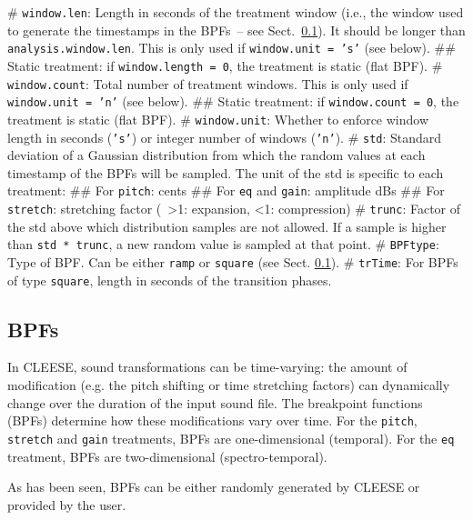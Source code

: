 \documentclass[oneside,10pt]{article}
\newcommand{\mip}{\texttt}
\newcommand{\mic}{\texttt}
\begin{document}
\vspace{10pt}
\begin{easylist}[itemize]
# \texttt{window.len}: Length in seconds of the treatment window (i.e., the
        window used to generate the timestamps in the BPFs~-- see
        Sect.~\ref{sec:bpf}). It should be longer than
        \texttt{analysis.window.len}. This is only used if \mic{window.unit =
        's'} (see below).
## Static treatment: if \mic{window.length = 0}, the treatment is static (flat BPF).
# \texttt{window.count}: Total number of treatment windows. This is only used
        if \mic{window.unit = 'n'} (see below).
## Static treatment: if \mic{window.count = 0}, the treatment is static (flat BPF).
# \texttt{window.unit}: Whether to enforce window length in seconds (\mic{'s'})
        or integer number of windows (\mic{'n'}).
# \texttt{std}: Standard deviation of a Gaussian distribution from which the
        random values at each timestamp of the BPFs will be sampled. The unit
        of the std is specific to each treatment:
## For \texttt{pitch}: cents
## For \texttt{eq} and \texttt{gain}: amplitude dBs
## For \texttt{stretch}: stretching factor (~>1: expansion, <1: compression)
# \texttt{trunc}: Factor of the std above which distribution samples are not
        allowed. If a sample is higher than \mip{std * trunc}, a new random value
        is sampled at that point.
# \texttt{BPFtype}: Type of BPF. Can be either \texttt{ramp} or \texttt{square}
        (see Sect. \ref{sec:bpf}).
# \texttt{trTime}: For BPFs of type \texttt{square}, length in seconds of the
        transition phases.
\end{easylist}
\vspace{8pt}

\subsection{BPFs}\label{sec:bpf}

In CLEESE, sound transformations can be time-varying: the amount of
modification (e.g. the pitch shifting or time stretching factors) can
dynamically change over the duration of the input sound file. The breakpoint
functions (BPFs) determine how these modifications vary over time. For the
\texttt{pitch}, \texttt{stretch} and \texttt{gain} treatments, BPFs are
one-dimensional (temporal). For the \texttt{eq} treatment, BPFs are
two-dimensional (spectro-temporal).

As has been seen, BPFs can be either randomly generated by CLEESE or provided
by the user.
\end{document}
